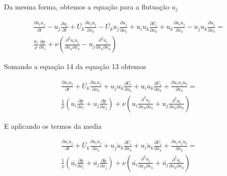 \documentclass[12pt]{article}
\begin{document}
Da mesma forma, obtemos a equação para a flutuação $u_j$

\begin{equation}
	\begin{split}
		\frac{\partial u_i u_j}{\partial t} 
		- u_j \frac{\partial u_i}{\partial t} 
		+ \overline{U_k} \frac{\partial u_i u_j}{\partial x_k} 
		- \overline{U_k} u_j \frac{\partial u_j}{\partial x_k} 
		+ u_i u_k \frac{\partial \overline{U_i}}{\partial x_k} 
		+ u_k \frac{\partial u_i u_j}{\partial x_k} 
		- u_j u_k \frac{\partial u_j}{\partial x_k} 
		= \\
		\frac{u_i}{\rho} \frac{\partial p}{\partial x_i} + \nu \left(  \frac{\partial ^ 2 u_i u_j}{\partial x_k \partial x_k} - u_j\frac{\partial ^ 2 u_j}{\partial x_k \partial x_k}\right) 
	\end{split}
\end{equation}

Somando a equação 14 da equação 13 obtemos

\begin{equation}
	\begin{split}
		\frac{\partial u_i u_j}{\partial t} 		
		+ \overline{U_k} \frac{\partial u_i u_j}{\partial x_k} + u_j u_k \frac{\partial \overline{U_i}}{\partial x_k} + u_i u_k \frac{\partial \overline{U_i}}{\partial x_k} + \frac{\partial u_i u_j u_k}{\partial x_k}		
		= \\
		\frac{1}{\rho} \left( u_i\frac{\partial p}{\partial x_i} + u_j \frac{\partial p}{\partial x_j} \right) + \nu \left(  u_i\frac{\partial ^ 2  u_j}{\partial x_k \partial x_k} + u_j\frac{\partial ^ 2 u_i}{\partial x_k \partial x_k}\right) 
	\end{split}
\end{equation}

E aplicando os termos da media

\begin{equation}
	\begin{split}
		\frac{\partial \overline{u_i u_j}}{\partial t} 		
		+ \overline{U_k} \frac{\partial \overline{u_i u_j}}{\partial x_k} + \overline{u_j u_k} \frac{\partial \overline{U_i}}{\partial x_k} + \overline{u_i u_k} \frac{\partial \overline{U_i}}{\partial x_k} + \frac{\partial \overline{u_i u_j u_k}}{\partial x_k}		
		= \\
		\frac{1}{\rho} \left( \overline{u_i}\frac{\partial \overline{p}}{\partial x_i} + \overline{u_j} \frac{\partial \overline{p}}{\partial x_j} \right) + \nu \left(  \overline{u_i}\frac{\partial ^ 2  \overline{u_j}}{\partial x_k \partial x_k} + \overline
		{u_j}\frac{\partial ^ 2 \overline{u_i}}{\partial x_k \partial x_k}\right) 
	\end{split}
\end{equation}
\end{document}
